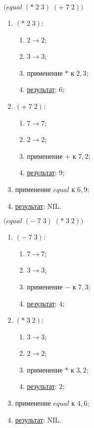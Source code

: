 \newpage
\problem $\bigl(equal\; (*\; 2\; 3)\; (+\; 7\; 2) \bigr)$

\begin{enumerate}
	\item $(*\; 2\; 3)$:
	\begin{enumerate}
		\item $2 \to 2$;
		\item $3 \to 3$;
		\item применение $*$ к $2, 3$;
		\item \underline{результат}: $6$;
	\end{enumerate}
	\item $(+\; 7\; 2)$:
	\begin{enumerate}
		\item $7 \to 7$;
		\item $2 \to 2$;
		\item применение $+$ к $7, 2$;
		\item \underline{результат}: $9$;
	\end{enumerate}
	\item применение $equal$ к $6, 9$;
	\item \underline{результат}: NIL.
\end{enumerate}


\problem $\bigl(equal\; (-\; 7\; 3)\; (*\; 3\; 2) \bigr)$

\begin{enumerate}
	\item $(-\; 7\; 3)$:
	\begin{enumerate}
		\item $7 \to 7$;
		\item $3 \to 3$;
		\item применение $-$ к $7, 3$;
		\item \underline{результат}: $4$;
	\end{enumerate}
	\item $(*\; 3\; 2)$:
	\begin{enumerate}
		\item $3 \to 3$;
		\item $2 \to 2$;
		\item применение $*$ к $3, 2$;
		\item \underline{результат}: $2$;
	\end{enumerate}
	\item применение $equal$ к $4, 6$;
	\item \underline{результат}: NIL.
\end{enumerate}